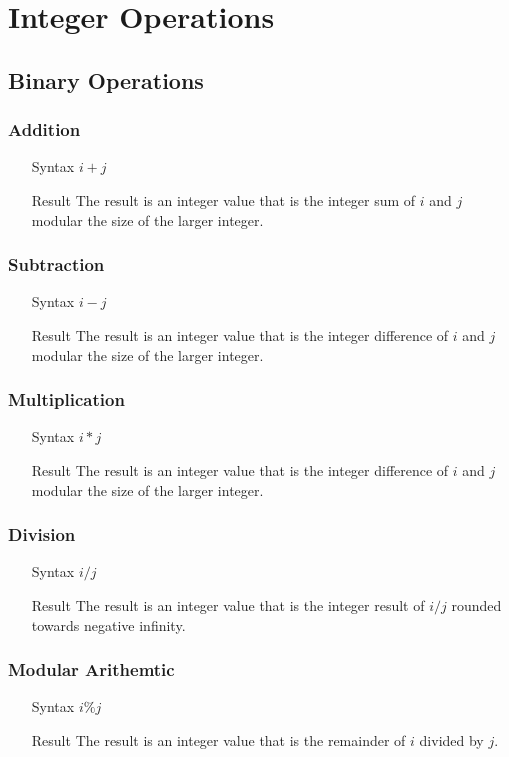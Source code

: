 \section{Integer Operations}
\subsection{Binary Operations}
\subsubsection{Addition}
\begin{itemize}
\item[Syntax] $i + j$
\item[Result] The result is an integer value that is the integer sum of $i$ and $j$ modular the size of the larger integer.
\end{itemize}
\subsubsection{Subtraction}
\begin{itemize}
\item[Syntax] $i - j$
\item[Result] The result is an integer value that is the integer difference of $i$ and $j$ modular the size of the larger integer.
\end{itemize}
\subsubsection{Multiplication}
\begin{itemize}
\item[Syntax] $i * j$
\item[Result] The result is an integer value that is the integer difference of $i$ and $j$ modular the size of the larger integer.
\end{itemize}
\subsubsection{Division}
\begin{itemize}
\item[Syntax] $i / j$
\item[Result] The result is an integer value that is the integer result of $i / j$ rounded towards negative infinity.
\end{itemize}
\subsubsection{Modular Arithemtic}
\begin{itemize}
\item[Syntax] $i \% j$
\item[Result] The result is an integer value that is the remainder of $i$ divided by $j$.
\end{itemize}
